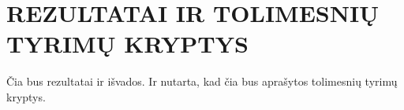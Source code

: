 
\section*{REZULTATAI IR TOLIMESNIŲ TYRIMŲ KRYPTYS}

Čia bus rezultatai ir išvados. Ir nutarta, kad čia bus aprašytos tolimesnių tyrimų kryptys.